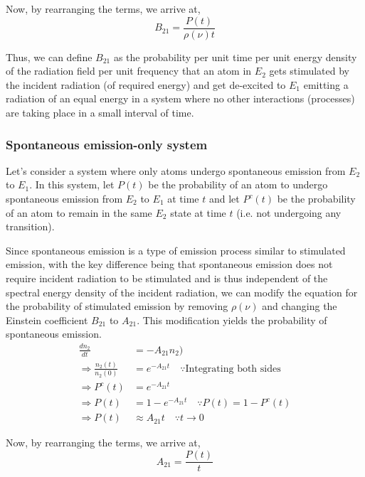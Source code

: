 \documentclass[12pt]{article}
\begin{document}
Now, by rearranging the terms, we arrive at,
\begin{equation}
    B_{21} = \frac{P(t)}{\rho(\nu)t}
\end{equation}

Thus, we can define $B_{21}$ as the probability per unit time per unit energy density of the radiation field per unit frequency that an atom in $E_{2}$ gets stimulated by the incident radiation (of required energy) and get de-excited to $E_{1}$ emitting a radiation of an equal energy in a system where no other interactions (processes) are taking place in a small interval of time.

\subsubsection{Spontaneous emission-only system}

Let's consider a system where only atoms undergo spontaneous emission from $E_{2}$ to $E_{1}$. In this system, let $P(t)$ be the probability of an atom to undergo spontaneous emission from $E_{2}$ to $E_{1}$ at time $t$ and let $P^c(t)$ be the probability of an atom to remain in the same $E_{2}$ state at time $t$ (i.e. not undergoing any transition). \vspace{.2cm}

Since spontaneous emission is a type of emission process similar to stimulated emission, with the key difference being that spontaneous emission does not require incident radiation to be stimulated and is thus independent of the spectral energy density of the incident radiation, we can modify the equation for the probability of stimulated emission by removing $\rho(\nu)$ and changing the Einstein coefficient $B_{21}$ to $A_{21}$. This modification yields the probability of spontaneous emission.
\begin{align*}
    \frac{dn_{2}}{dt} &= -A_{21}n_{2}) \\
    \Rightarrow \frac{n_2(t)}{n_2(0)} &= e^{-A_{21}t} \quad \because \text{Integrating both sides} \\
    \Rightarrow P^c(t) &= e^{-A_{21}t} \\
    \Rightarrow P(t) &= 1 - e^{-A_{21}t} \quad \because P(t) = 1 - P^c(t) \\
    \Rightarrow P(t) & \approx A_{21}t \quad \because t \to 0
\end{align*}

Now, by rearranging the terms, we arrive at,
\begin{equation}
    A_{21} = \frac{P(t)}{t}
\end{equation}
\end{document}
